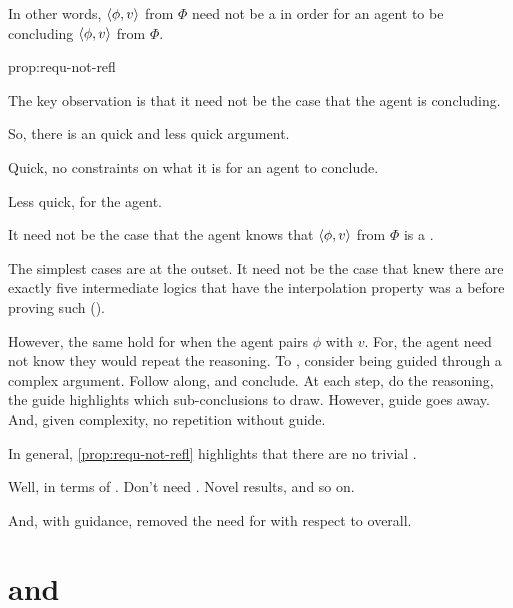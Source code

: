 \begin{note}
  In other words, \(\langle \phi, v \rangle\) from \(\Phi\) need not be a \fc{} in order for an agent to be concluding \(\langle \phi, v \rangle\) from \(\Phi\).

  \begin{argument}{prop:requ-not-refl}
    {
      \color{red}
      The key observation is that it need not be the case that the agent is concluding.

      So, there is an quick and less quick argument.

      Quick, no constraints on what it is for an agent to conclude.

      Less quick, \fc{} for the agent.
    }


    It need not be the case that the agent knows that \(\langle \phi, v \rangle\) from \(\Phi\) is a \fc{}.

    The simplest cases are at the outset.
    It need not be the case that \citeauthor{Maksimova:1977un} knew there are exactly five intermediate logics that have the interpolation property was a \fc{} before proving such (\cite[cf.][]{Maksimova:1977un}).

    However, the same hold for when the agent pairs \(\phi\) with \(v\).
    For, the agent need not know they would repeat the reasoning.
    To , consider being guided through a complex argument.
    Follow along, and conclude.
    At each step, do the reasoning, the guide highlights which sub-conclusions to draw.
    However, guide goes away.
    And, given complexity, no repetition without guide.
  \end{argument}

  In general, \autoref{prop:requ-not-refl} highlights that there are no trivial .

  Well, in terms of \tR{}.
  Don't need \tR{}.
  Novel results, and so on.

  And, with guidance, removed the need for \tR{} with respect to overall.
\end{note}

\section{ and }
\label{cha:requs:sec:add-illu}



